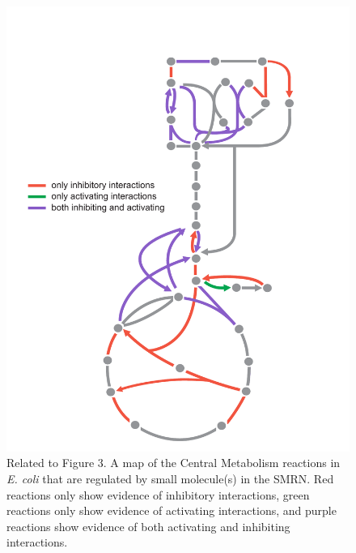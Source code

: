 \documentclass[12pt,a4paper]{article}
\begin{document}
\begin{figure}[ht!]
	\includegraphics[width=\textwidth]{../manuscript/figS8.pdf}
	\caption{Related to Figure 3. A map of the Central Metabolism reactions in \emph{E. coli} that are regulated by small molecule(s) in the SMRN. Red reactions only show evidence of inhibitory interactions, green reactions only show evidence of activating interactions, and purple reactions show evidence of both activating and inhibiting interactions. 
	}
\end{figure}
\end{document}

